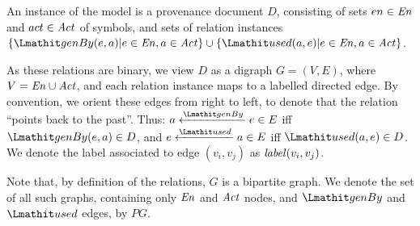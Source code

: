 %
An instance  of the model is a provenance document $D$, consisting of sets $en \in \mathit{En}$ and $act \in \mathit{Act}$ of symbols, and sets of relation instances $\{ \wgby(e,a)  | e \in \en, a \in \act \} \cup   \{ \used(a,e)  | e \in \en, a \in \act\}$. 

%
As these relations are binary, we view $D$ as a digraph $G=(V,E)$, where $V= \mathit{En} \cup \mathit{Act}$, and each relation instance maps to a labelled directed edge. By convention, we orient these edges from right to left, to denote that the relation ``points back to the past''. Thus:
$a \xleftarrow{\wgby} e \in E$ iff $\wgby(e,a) \in D$, and $e \xleftarrow{\used} a \in E$ iff $\used(a,e) \in D$.
%
We denote the label associated to edge $(v_i, v_j)$ as $\mathit{label}(v_i,v_j)$. 

%
Note that, by definition of the relations, $G$ is a bipartite graph.
We denote the set of all such graphs, containing only $\mathit{En}$ and $\mathit{Act}$ nodes, and $\wgby$ and $\used$ edges,  by $PG$. 

% 
